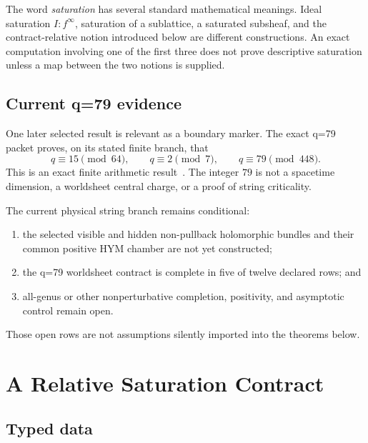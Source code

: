 \documentclass[11pt]{article}
\begin{document}
The word \emph{saturation} has several standard mathematical meanings.  Ideal
saturation $I:f^\infty$, saturation of a sublattice, a saturated subsheaf, and
the contract-relative notion introduced below are different constructions.
An exact computation involving one of the first three does not prove
descriptive saturation unless a map between the two notions is supplied.

\subsection{Current q=79 evidence}

One later selected result is relevant as a boundary marker.  The exact q=79
packet proves, on its stated finite branch, that
\[
 q\equiv 15\pmod {64},
 \qquad
 q\equiv 2\pmod 7,
 \qquad
 q\equiv 79\pmod {448}.
\]
This is an exact finite arithmetic result~\cite{Q79}.  The integer $79$ is not
a spacetime dimension, a worldsheet central charge, or a proof of string
criticality.

The current physical string branch remains conditional:
\begin{enumerate}
\item the selected visible and hidden non-pullback holomorphic bundles and
their common positive HYM chamber are not yet constructed;
\item the q=79 worldsheet contract is complete in five of twelve declared rows;
and
\item all-genus or other nonperturbative completion, positivity, and
asymptotic control remain open.
\end{enumerate}
Those open rows are not assumptions silently imported into the theorems below.

\section{A Relative Saturation Contract}

\subsection{Typed data}
\end{document}
